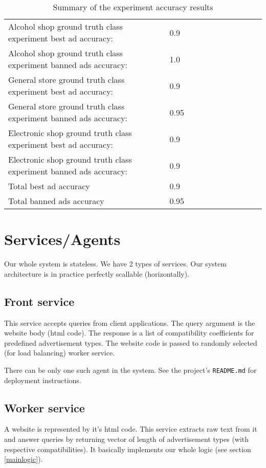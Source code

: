 \documentclass[a4paper]{article}
\begin{document}
\begin{table}[!hbt]
    \caption{ Summary of the experiment accuracy results
    \label{table:testResults}
    }
\footnotesize
\begin{center}
    \begin{tabular}{|l|l|l|l|l|l|l|l|l|l|l|}
    \hline
        Alcohol shop ground truth class experiment best ad accuracy:  &
        0.9 \\
        Alcohol shop ground truth class experiment banned ads accuracy: &
        1.0 \\
    \hline
        General store ground truth class experiment best ad accuracy: &
        0.9 \\
        General store ground truth class experiment banned ads accuracy: &
        0.95 \\
    \hline
        Electronic shop ground truth class experiment best ad accuracy: &
        0.9 \\
        Electronic shop ground truth class experiment banned ads accuracy: &
        0.9 \\
    \hline
        Total best ad accuracy & 0.9 \\
        Total banned ads accuracy & 0.95 \\
    \hline
    \end{tabular}
\end{center}
\end{table}


\section{Services/Agents}
Our whole system is stateless.
We have 2 types of services.
Our system architecture is in practice perfectly scallable (horizontally).

\subsection{Front service}

This service accepts queries from client applications.
The query argument is the website body (html code).
The response is a list of compatibility coefficients for predefined advertisement types.
The website code is passed to randomly selected (for load balancing) worker service.

There can be only one such agent in the system.
See the project's \texttt{README.md} for deployment instructions.


\subsection{Worker service}
A website is represented by it's html code.
This service extracts raw text from it and answer queries by returning vector of length of advertisement types
(with respective compatibilities).
It basically implements our whole logic (see section \ref{mainlogic}).
\end{document}
